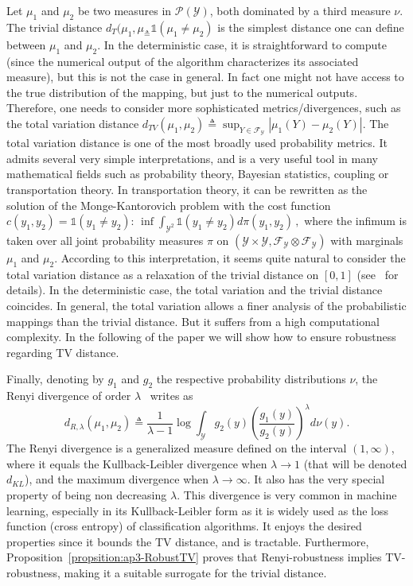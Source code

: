 Let  $\mu_1$ and $\mu_2$ be two measures in $\mathcal{P}(\mathcal{Y})$, both dominated by a third measure $\nu$.
The trivial distance $ d_{T}(\mu_1,\mu_ \triangleq \mathds{1}\left(\mu_1 \neq \mu_2\right)$ is the simplest distance one can define between $\mu_1$ and $\mu_2$.
In the deterministic case, it is straightforward to compute (since the numerical output of the algorithm characterizes its associated measure), but this is not the case in general.
In fact one might not have access to the true distribution of the mapping, but just to the numerical outputs.
Therefore, one needs to consider more sophisticated metrics/divergences, such as the total variation distance $d_{TV}(\mu_1,\mu_2) \triangleq \sup_{Y \in \mathcal{F}_{\mathcal{Y}}} |\mu_1 (Y) - \mu_2(Y)|$.
The total variation distance is one of the most broadly used probability metrics.
It admits several very simple interpretations, and is a very useful tool in many mathematical fields such as probability theory, Bayesian statistics, coupling or transportation theory.
In transportation theory, it can be rewritten as the solution of the Monge-Kantorovich problem with the cost function $c(y_1,y_2) =\mathds{1}\left(y_1 \neq y_2\right)$: $ \inf\int_{\mathcal{Y}^{2}}\mathds{1}\left(y_1 \neq y_2\right) d\pi(y_1,y_2)\, ,$ where the infimum is taken over all joint probability measures $\pi$ on $(\mathcal{Y}\times \mathcal{Y}, \mathcal{F}_{\mathcal{Y} } \otimes \mathcal{F}_{\mathcal{Y}})$ with marginals $\mu_1$ and $\mu_2$.
According to this interpretation, it seems quite natural to consider the total variation distance as a relaxation of the trivial distance on $[0,1]$ (see~\cite{villani2008optimal} for details).
In the deterministic case, the total variation and the trivial distance coincides.
In general, the total variation allows a finer analysis of the probabilistic mappings than the trivial distance.
But it suffers from a high computational complexity.
In the following of the paper we will show how to ensure robustness regarding TV distance.

Finally, denoting by $g_1$ and $g_2$ the respective probability distributions \wrt $\nu$, the Renyi divergence of order $\lambda$~\cite{renyi1961} writes as  
\begin{equation}
  d_{R,\lambda}(\mu_1,\mu_2) \triangleq \frac{1}{\lambda -1}\log \int_{\mathcal{Y}} g_2(y)  \left(\frac{g_1(y)}{g_2(y)}\right)^{\lambda} d\nu(y).
\end{equation}
The Renyi divergence is a generalized measure defined on the interval $(1,\infty)$, where it equals the Kullback-Leibler divergence when $\lambda \rightarrow 1$ (that will be denoted $d_{KL}$), and the maximum divergence when $\lambda \rightarrow \infty$.
It also has the very special property of being non decreasing \wrt $\lambda$.
This divergence is very common in machine learning, especially in its Kullback-Leibler form as it is widely used as the loss function (cross entropy) of classification algorithms.
It enjoys the desired properties  since it bounds the TV distance, and is tractable.
Furthermore, Proposition~\ref{propsition:ap3-RobustTV} proves that Renyi-robustness implies TV-robustness, making it a suitable surrogate for the trivial distance. 

